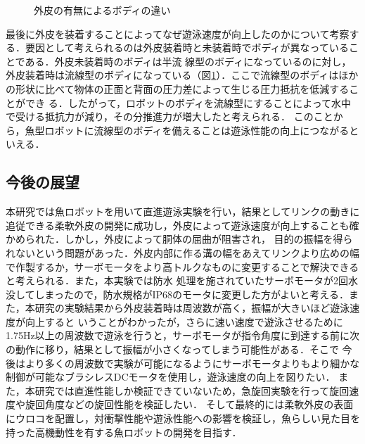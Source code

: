 \begin{figure}[t]
    \centering
    \caption{外皮の有無によるボディの違い}
    \label{fig:body}
\end{figure}

最後に外皮を装着することによってなぜ遊泳速度が向上したのかについて考察する．要因として考えられるのは外皮装着時と未装着時でボディが異なっていることである．外皮未装着時のボディは半流
線型のボディになっているのに対し，外皮装着時は流線型のボディになっている（図\ref{fig:body}）．ここで流線型のボディはほかの形状に比べて物体の正面と背面の圧力差によって生じる圧力抵抗を低減することができ
る．したがって，ロボットのボディを流線型にすることによって水中で受ける抵抗力が減り，その分推進力が増大したと考えられる．
このことから，魚型ロボットに流線型のボディを備えることは遊泳性能の向上につながるといえる．

\subsection{今後の展望}
本研究では魚ロボットを用いて直進遊泳実験を行い，結果としてリンクの動きに追従できる柔軟外皮の開発に成功し，外皮によって遊泳速度が向上することも確かめられた．しかし，外皮によって胴体の屈曲が阻害され，
目的の振幅を得られないという問題があった．外皮内部に作る溝の幅をあえてリンクより広めの幅で作製するか，サーボモータをより高トルクなものに変更することで解決できると考えられる．また，本実験では防水
処理を施されていたサーボモータが2回水没してしまったので，防水規格がIP68のモータに変更した方がよいと考える．また，本研究の実験結果から外皮装着時は周波数が高く，振幅が大きいほど遊泳速度が向上すると
いうことがわかったが，さらに速い速度で遊泳させるために1.75Hz以上の周波数で遊泳を行うと，サーボモータが指令角度に到達する前に次の動作に移り，結果として振幅が小さくなってしまう可能性がある．そこで
今後はより多くの周波数で実験が可能になるようにサーボモータよりもより細かな制御が可能なブラシレスDCモータを使用し，遊泳速度の向上を図りたい．
また，本研究では直進性能しか検証できていないため，急旋回実験を行って旋回速度や旋回角度などの旋回性能を検証したい．
そして最終的には柔軟外皮の表面にウロコを配置し，対衝撃性能や遊泳性能への影響を検証し，魚らしい見た目を持った高機動性を有する魚ロボットの開発を目指す．